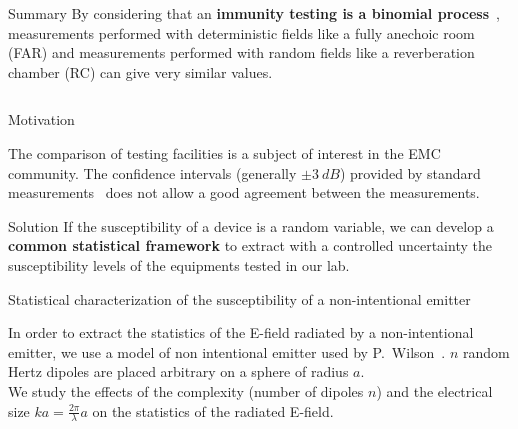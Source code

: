 \documentclass[final,hyperref={pdfpagelabels=false}]{beamer}
\begin{document}
\begin{frame}{}

      \begin{block}{\huge{Summary}}
      \LARGE{By considering that an \textbf{immunity testing is a binomial process}~\cite{Amador13}, measurements performed with deterministic fields like a fully anechoic room (FAR) and measurements performed with random fields like a reverberation chamber (RC) can give very similar values.}  
      \end{block}
  \begin{columns}[t]
% 
    \begin{column}{0.32\linewidth}

	\vspace{-1cm}
      \begin{block}{Motivation}  \justifying
       \large{The comparison of testing facilities is a subject of interest in the EMC community.
	 The confidence intervals (generally $\pm 3~dB$) provided by standard measurements~\cite{IEC21,IEC22} does not allow a good agreement between the measurements.

      }
\end{block}
\begin{center}\begin{minipage}{0.9\textwidth}
	\begin{exampleblock}{{Solution}} \justifying
  \large{If the susceptibility of a device is a random variable, we can develop a \textbf{common statistical framework} to extract with a controlled uncertainty the susceptibility levels of the equipments tested in our lab. }
	\end{exampleblock}
\end{minipage}\end{center}
      \begin{block}{{Statistical characterization of the susceptibility of a non-intentional emitter}} \justifying
        \large{ In order to extract the statistics of the E-field radiated by a non-intentional emitter, we use a model of non intentional emitter used by P.~Wilson~\cite{Wilson02}. $n$ random Hertz dipoles are placed arbitrary on a sphere of radius $a$.\\
We study the effects of the complexity (number of dipoles $n$) and the electrical size $ka=\frac{2\pi}{\lambda}a$ on the statistics of the radiated E-field.


}
\end{block}
\end{column}
\end{columns}
\end{frame}
\end{document}
